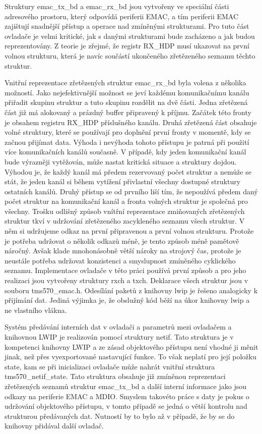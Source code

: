 Struktury emac\_tx\_bd a emac\_rx\_bd jsou vytvořeny ve speciální části adresového prostoru, který odpovídá periferii EMAC, a tím periferii EMAC zajištují snadnější přístup a operace nad zmíněnými strukturami. Pro tuto část ovladače je velmi kritické, jak s danými strukturami bude zacházeno a jak budou reprezentovány. Z teorie je zřejmé, že registr RX\_HDP musí ukazovat na první volnou strukturu, která je navíc součástí ukončeného zřetězeného seznamu těchto struktur.

Vnitřní reprezentace zřetězených struktur emac\_rx\_bd byla volena z několika možností. Jako nejefektivnější možnost se jeví každému komunikačnímu kanálu přiřadit skupinu struktur a tuto skupinu rozdělit na dvě části. Jedna zřetězená část již má alokovaný a prázdný buffer připravený k příjmu. Začátek této fronty je obsahem registru RX\_HDP příslušného kanálu. Druhá zřetězená část obsahuje volné struktury, které se používají pro doplnění první fronty v momentě, kdy se začnou přijímat data. Výhoda i nevýhoda tohoto přístupu je patrná při použití více komunikačních kanálů současně. V případě, kdy jeden komunikační kanál bude výrazněji vytěžován, může nastat kritická situace a struktury dojdou. Výhodou je, že každý kanál má předem rezervovaný počet struktur a nemůže se stát, že jeden kanál si během vytížení přivlastní všechny dostupné struktury ostatních kanálů. Druhý přístup se od prvního liší tím, že nepoužívá předem daný počet struktur na komunikační kanál a fronta volných struktur je společná pro všechny. Trošku odlišný způsob vnítřní reprezentace zmiňovaných zřetězených struktur tkví v udržování zřetězeného zacykleného seznamu všech struktur. V něm si udržujeme odkaz na první připravenou a první volnou strukturu. Protože je potřeba udržovat o několik odkazů méně, je tento způsob méně pamětově náročný. Avšak klade mnohonásobně větší nároky na strojový čas, protože je neustále potřeba udržovat konzistenci a smyslupnost zmíněného cyklického seznamu. Implementace ovladače v této práci používá první způsob a pro jeho realizaci jsou vytvořeny struktury rxch a txch. Deklarace všech struktur jsou v souboru tms570\_emac.h. Odesílání paketů z knihovny lwip je řešeno analogicky k přijímání dat. Jediná výjimka je, že obslužný kód běží na úkor knihovny lwip a ne vlastního vlákna.

Systém předávání interních dat v ovladači a parametrů mezi ovladačem a knihovnou LWIP je realizován pomocí struktury netif. Tato struktura je v kompetenci knihovny LWIP a ze zásad objektového přístupu není vhodné ji měnit jinak, než přes vyexportované nastavující funkce. To však neplatí pro její položku state, kam se při inicializaci ovladače může nahrát vnitřní struktura tms570\_netif\_state. Tato struktura obsahuje již zmíněnou reprezentaci zřetězených seznamů struktur emac\_tx\_bd a další interní informace jako jsou odkazy na periferie EMAC a MDIO. Smyslem takovéto práce s daty je pokus o udržování objektového přístupu, v tomto případě se jedná o větší kontrolu nad strukturou předávaných dat. Nutností by to bylo až v případě, že by se do knihovny přidával další ovladač.

